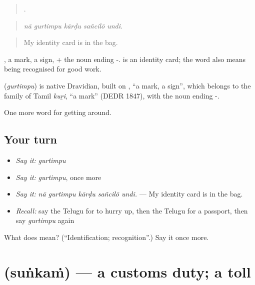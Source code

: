 \begin{quote}
    .
\end{quote}

\begin{quote}
\emph{nā gurtimpu kārḍu sañcilō undi.}
\end{quote}

\begin{quote}
My identity card is in the bag.
\end{quote}

, a mark, a sign, + the noun ending -.   is an identity card; the word also means being recognised for good work.

\begin{cousinweb}
\textbf{} (\emph{gurtimpu}) is native Dravidian, built on , \textquotedblleft{}a mark, a sign\textquotedblright{}, which belongs to the family of Tamil \emph{kuṟi}, \textquotedblleft{}a mark\textquotedblright{} (DEDR 1847), with the noun ending -.
\end{cousinweb}

\begin{grammarlens}[title={What you've built}]
One more word for getting around.
\end{grammarlens}

\subsection*{Your turn}
\begin{itemize}
\raggedright
  \item \emph{Say it:} \emph{gurtimpu}
  \item \emph{Say it:} \emph{gurtimpu}, once more
  \item \emph{Say it:} \emph{nā gurtimpu kārḍu sañcilō undi.} — My identity card is in the bag.
  \item \emph{Recall:} say the Telugu for to hurry up, then the Telugu for a passport, then say \emph{gurtimpu} again
\end{itemize}

\begin{tcolorbox}[breakable,colback=teal!4,colframe=teal!35!black,title={Before you move on}]
What does  mean? (\textquotedblleft{}Identification; recognition\textquotedblright{}.) Say it once more.
\end{tcolorbox}
\section[\texorpdfstring{\te{సుంకం} (suṅkaṁ)}{సుంకం (suṅkaṁ)}]{ (suṅkaṁ) — a customs duty; a toll}

